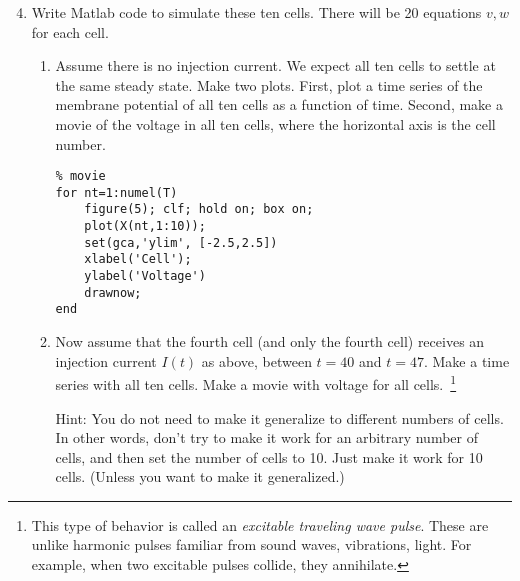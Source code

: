 \documentclass{exam}
\begin{document}
\begin{enumerate}
\setcounter{enumi}{3}
\item Write Matlab code to simulate these ten cells. There will be 20 equations $v,w$ for each cell. 
\begin{enumerate}
\item Assume there is no injection current. We expect all ten cells to settle at the same steady state. Make two plots. First, plot a time series of the membrane potential of all ten cells as a function of time. Second, make a movie of the voltage in all ten cells, where the horizontal axis is the cell number. 
\begin{lstlisting}
% movie
for nt=1:numel(T)
    figure(5); clf; hold on; box on;
    plot(X(nt,1:10)); 
    set(gca,'ylim', [-2.5,2.5])
    xlabel('Cell');
    ylabel('Voltage')
    drawnow;
end
\end{lstlisting}

\item Now assume that the fourth cell (and only the fourth cell) receives an injection current $I(t)$ as above, between $t=40$ and $t=47$. Make a time series with all ten cells. Make a movie with voltage for all cells.~\footnote{This type of behavior  is called an \emph{excitable traveling wave pulse}. These are unlike harmonic pulses familiar from sound waves, vibrations, light. For example, when two excitable pulses collide, they annihilate.}

Hint: You do not need to make it generalize to different numbers of cells. In other words, don't try to make it work for an arbitrary number of cells, and then set the number of cells to 10. Just make it work for 10 cells. (Unless you want to make it generalized.) 
\end{enumerate}
\end{enumerate}





  
\end{document}
